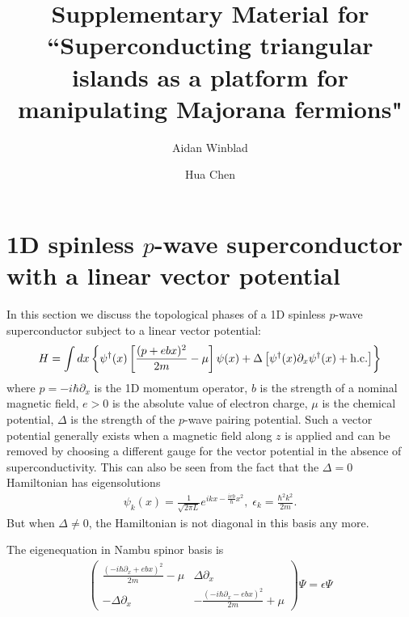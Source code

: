 \documentclass[aps,prb,showpacs,amsmath,amssymb,superscriptaddress]{revtex4-2}
\begin{document}
	
\title{Supplementary Material for ``Superconducting triangular islands as a platform for manipulating Majorana fermions"}
	
\author{Aidan Winblad}

\author{Hua Chen}

\maketitle

\section{1D spinless $p$-wave superconductor with a linear vector potential}
In this section we discuss the topological phases of a 1D spinless $p$-wave superconductor subject to a linear vector potential:
\begin{eqnarray}
	H = \int dx \left\{   \psi^\dag(x) \left[ \frac{(p+ebx)^2}{2m} -\mu \right]\psi(x) + \Delta\left[  \psi^\dag(x) \partial_x \psi^\dag(x) + {\rm h.c.} \right] \right\}
\end{eqnarray} 
where $p=-i\hbar \partial_x$ is the 1D momentum operator, $b$ is the strength of a nominal magnetic field, $e>0$ is the absolute value of electron charge, $\mu$ is the chemical potential, $\Delta$ is the strength of the $p$-wave pairing potential. Such a vector potential generally exists when a magnetic field along $z$ is applied and can be removed by choosing a different gauge for the vector potential in the absence of superconductivity. This can also be seen from the fact that the $\Delta = 0$ Hamiltonian has eigensolutions 
\begin{eqnarray}
	\psi_k(x) = \frac{1}{\sqrt{2\pi L}} e^{i k x - \frac{ieb}{\hbar}x^2},\; \epsilon_k = \frac{\hbar^2 k^2}{2m}.
\end{eqnarray}
But when $\Delta \neq 0$, the Hamiltonian is not diagonal in this basis any more. 

The eigenequation in Nambu spinor basis is 
\begin{eqnarray}
	\begin{pmatrix}
		\frac{(-i\hbar \partial_x + eb x)^2}{2m} - \mu & \Delta \partial_x \\
		-\Delta \partial_x & -\frac{(-i\hbar \partial_x - eb x)^2}{2m} + \mu
	\end{pmatrix} \Psi = \epsilon \Psi
\end{eqnarray}


\end{document}
